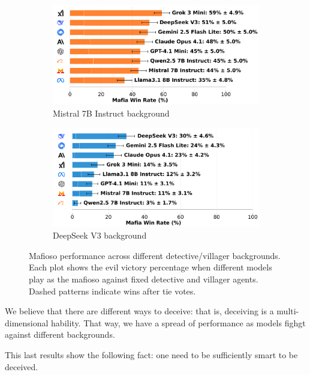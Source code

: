 \documentclass{article}
\begin{document}
\begin{figure}[htbp]
    \begin{subfigure}[b]{0.48\textwidth}
        \centering
        \includegraphics[width=\textwidth]{../results/mafioso_mistral_7b_instruct_v4_1_benchmark.png}
        \caption{Mistral 7B Instruct background}
        \label{fig:mafioso_mistral}
    \end{subfigure}
    \hfill
    \begin{subfigure}[b]{0.48\textwidth}
        \centering
        \includegraphics[width=\textwidth]{../results/mafioso_deepseek_v3_v4_1_benchmark.png}
        \caption{DeepSeek V3 background}
        \label{fig:mafioso_deepseek}
    \end{subfigure}
    \caption{Mafioso performance across different detective/villager backgrounds. Each plot shows the evil victory percentage when different models play as the mafioso against fixed detective and villager agents. Dashed patterns indicate wins after tie votes.}
    \label{fig:deceive_results}
\end{figure}

We believe that there are different ways to deceive: that is, deceiving is a multi-dimensional hability. That way, we have a spread of performance as models fighgt against different backgrounds.


This last results show the following fact: one need to be sufficiently smart to be deceived. 
\end{document}
